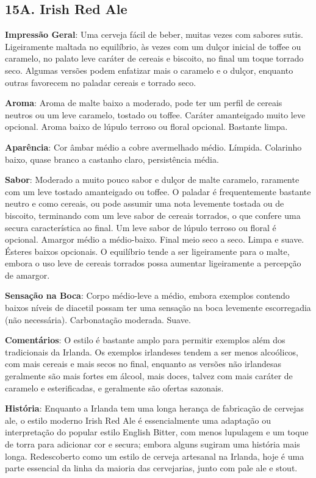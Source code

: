 \subsection*{15A. Irish Red Ale}
\textbf{Impressão Geral}: Uma cerveja fácil de beber, muitas vezes com sabores sutis. Ligeiramente maltada no equilíbrio, às vezes com um dulçor inicial de toffee ou caramelo, no palato leve caráter de cereais e biscoito, no final um toque torrado seco. Algumas versões podem enfatizar mais o caramelo e o dulçor, enquanto outras favorecem no paladar cereais e torrado seco.

\textbf{Aroma}: Aroma de malte baixo a moderado, pode ter um perfil de cereais neutros ou um leve caramelo, tostado ou toffee. Caráter amanteigado muito leve opcional. Aroma baixo de lúpulo terroso ou floral opcional. Bastante limpa.

\textbf{Aparência}: Cor âmbar médio a cobre avermelhado médio. Límpida. Colarinho baixo, quase branco a castanho claro, persistência média.

\textbf{Sabor}: Moderado a muito pouco sabor e dulçor de malte caramelo, raramente com um leve tostado amanteigado ou toffee. O paladar é frequentemente bastante neutro e como cereais, ou pode assumir uma nota levemente tostada ou de biscoito, terminando com um leve sabor de cereais torrados, o que confere uma secura característica ao final. Um leve sabor de lúpulo terroso ou floral é opcional. Amargor médio a médio-baixo. Final meio seco a seco. Limpa e suave. Ésteres baixos opcionais. O equilíbrio tende a ser ligeiramente para o malte, embora o uso leve de cereais torrados possa aumentar ligeiramente a percepção de amargor.

\textbf{Sensação na Boca}: Corpo médio-leve a médio, embora exemplos contendo baixos níveis de diacetil possam ter uma sensação na boca levemente escorregadia (não necessária). Carbonatação moderada. Suave.

\textbf{Comentários}: O estilo é bastante amplo para permitir exemplos além dos tradicionais da Irlanda. Os exemplos irlandeses tendem a ser menos alcoólicos, com mais cereais e mais secos no final, enquanto as versões não irlandesas geralmente são mais fortes em álcool, mais doces, talvez com mais caráter de caramelo e esterificadas, e geralmente são ofertas sazonais.

\textbf{História}: Enquanto a Irlanda tem uma longa herança de fabricação de cervejas ale, o estilo moderno Irish Red Ale é essencialmente uma adaptação ou interpretação do popular estilo English Bitter, com menos lupulagem e um toque de torra para adicionar cor e secura; embora alguns sugiram uma história mais longa. Redescoberto como um estilo de cerveja artesanal na Irlanda, hoje é uma parte essencial da linha da maioria das cervejarias, junto com pale ale e stout.

